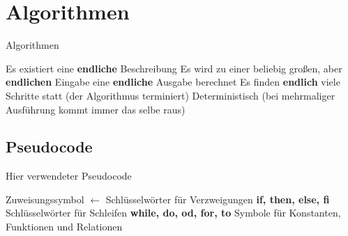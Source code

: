 \def\tutdate{22.12.2016}


\section{Algorithmen}
\begin{frame}{Algorithmen}
	\begin{itemize}
		\pitem Es existiert eine \textbf{endliche} Beschreibung
		\pitem Es wird zu einer beliebig großen, aber \textbf{endlichen} Eingabe eine \textbf{endliche} Ausgabe berechnet
		\pitem Es finden \textbf{endlich} viele Schritte statt (der Algorithmus terminiert)
		\pitem Deterministisch (bei mehrmaliger Ausführung kommt immer das selbe raus)
	\end{itemize}
\end{frame}

\subsection{Pseudocode}
\begin{frame}{Hier verwendeter Pseudocode}
	\begin{itemize}
		\pitem Zuweisungssymbol $\leftarrow$
		\pitem Schlüsselwörter für Verzweigungen \textbf{if, then, else, fi}
		\pitem Schlüsselwörter für Schleifen \textbf{while, do, od, for, to}
		\pitem Symbole für Konstanten, Funktionen und Relationen
	\end{itemize}
\end{frame}

